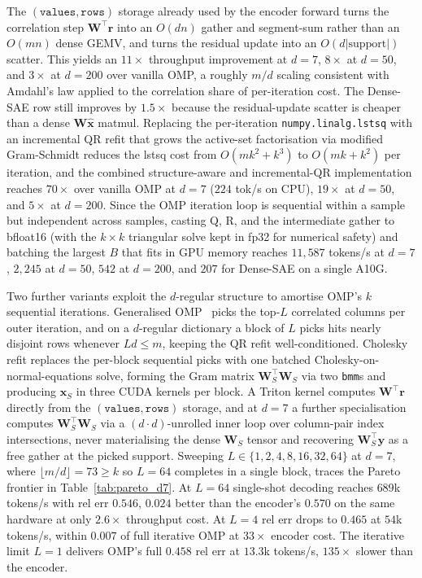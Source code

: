 \documentclass{article}
\theoremstyle{plain}
\theoremstyle{definition}
\theoremstyle{remark}
\begin{document}
The $(\texttt{values}, \texttt{rows})$ storage already used by the encoder forward turns the correlation step $\mathbf{W}^\top \mathbf{r}$ into an $O(dn)$ gather and segment-sum rather than an $O(mn)$ dense GEMV, and turns the residual update into an $O(d|\mathrm{support}|)$ scatter. This yields an $11\times$ throughput improvement at $d{=}7$, $8\times$ at $d{=}50$, and $3\times$ at $d{=}200$ over vanilla OMP, a roughly $m/d$ scaling consistent with Amdahl's law applied to the correlation share of per-iteration cost. The Dense-SAE row still improves by $1.5\times$ because the residual-update scatter is cheaper than a dense $\mathbf{W}\hat{\mathbf{x}}$ matmul. Replacing the per-iteration \texttt{numpy.linalg.lstsq} with an incremental QR refit that grows the active-set factorisation via modified Gram-Schmidt reduces the lstsq cost from $O(mk^2 + k^3)$ to $O(mk + k^2)$ per iteration, and the combined structure-aware and incremental-QR implementation reaches $70\times$ over vanilla OMP at $d{=}7$ ($224$ tok/s on CPU), $19\times$ at $d{=}50$, and $5\times$ at $d{=}200$. Since the OMP iteration loop is sequential within a sample but independent across samples, casting Q, R, and the intermediate gather to bfloat16 (with the $k\times k$ triangular solve kept in fp32 for numerical safety) and batching the largest $B$ that fits in GPU memory reaches $11{,}587$ tokens/s at $d{=}7$, $2{,}245$ at $d{=}50$, $542$ at $d{=}200$, and $207$ for Dense-SAE on a single A10G.

Two further variants exploit the $d$-regular structure to amortise OMP's $k$ sequential iterations. Generalised OMP~\citep{wang2012gomp} picks the top-$L$ correlated columns per outer iteration, and on a $d$-regular dictionary a block of $L$ picks hits nearly disjoint rows whenever $Ld \le m$, keeping the QR refit well-conditioned. Cholesky refit replaces the per-block sequential picks with one batched Cholesky-on-normal-equations solve, forming the Gram matrix $\mathbf{W}_S^\top \mathbf{W}_S$ via two \texttt{bmm}s and producing $\mathbf{x}_S$ in three CUDA kernels per block. A Triton kernel computes $\mathbf{W}^\top \mathbf{r}$ directly from the $(\texttt{values}, \texttt{rows})$ storage, and at $d{=}7$ a further specialisation computes $\mathbf{W}_S^\top \mathbf{W}_S$ via a $(d \cdot d)$-unrolled inner loop over column-pair index intersections, never materialising the dense $\mathbf{W}_S$ tensor and recovering $\mathbf{W}_S^\top \mathbf{y}$ as a free gather at the picked support. Sweeping $L \in \{1, 2, 4, 8, 16, 32, 64\}$ at $d{=}7$, where $\lfloor m/d \rfloor = 73 \ge k$ so $L{=}64$ completes in a single block, traces the Pareto frontier in Table~\ref{tab:pareto_d7}. At $L{=}64$ single-shot decoding reaches $689$k tokens/s with rel err $0.546$, $0.024$ better than the encoder's $0.570$ on the same hardware at only $2.6\times$ throughput cost. At $L{=}4$ rel err drops to $0.465$ at $54$k tokens/s, within $0.007$ of full iterative OMP at $33\times$ encoder cost. The iterative limit $L{=}1$ delivers OMP's full $0.458$ rel err at $13.3$k tokens/s, $135\times$ slower than the encoder.
\end{document}
